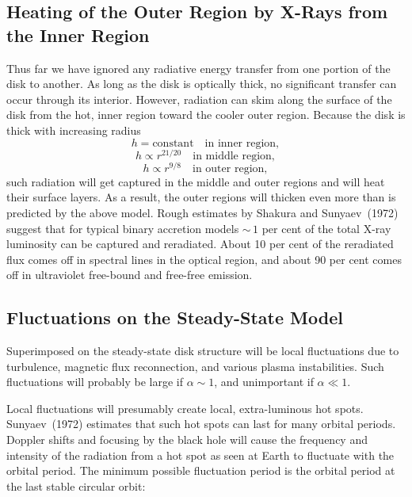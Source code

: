 

\subsection{Heating of the Outer Region by X-Rays from the Inner Region}
\label{sec:5.11}

Thus far we have ignored any radiative energy transfer from one portion of the
disk to another. As long as the disk is optically thick, no significant transfer can
occur through its interior. However, radiation can skim along the surface of the
disk from the hot, inner region toward the cooler outer region. Because the disk
is thick with increasing radius
%
\[
h = \text{constant} \quad \text{in inner region},
\]
\[
h \propto r^{21/20} \quad \text{in middle region},
\]
\[
h \propto r^{9/8} \quad \text{in outer region},
\]
%
such radiation will get captured in the middle and outer regions and will heat
their surface layers. As a result, the outer regions will thicken even more than is
predicted by the above model. Rough estimates by Shakura and Sunyaev~(1972)
\cite{ShakuraSunyaev1972}
suggest that for typical binary accretion models ${\sim}\,1$ per cent of the total X-ray
luminosity can be captured and reradiated. About 10 per cent of the reradiated
flux comes off in spectral lines in the optical region, and about 90 per cent comes
off in ultraviolet free-bound and free-free emission.


\subsection{Fluctuations on the Steady-State Model}
\label{sec:5.12}

Superimposed on the steady-state disk structure will be local fluctuations due to
turbulence, magnetic flux reconnection, and various plasma instabilities. Such
fluctuations will probably be large if $\alpha \sim 1$, and unimportant if $\alpha \ll 1$.

Local fluctuations will presumably create local, extra-luminous hot spots.
Sunyaev~(1972) \cite{Sunyaev1972} estimates that such hot spots can last for many orbital periods.
Doppler shifts and focusing by the black hole will cause the frequency and
intensity of the radiation from a hot spot as seen at Earth to fluctuate with the
orbital period. The minimum possible fluctuation period is the orbital period at
the last stable circular orbit:

